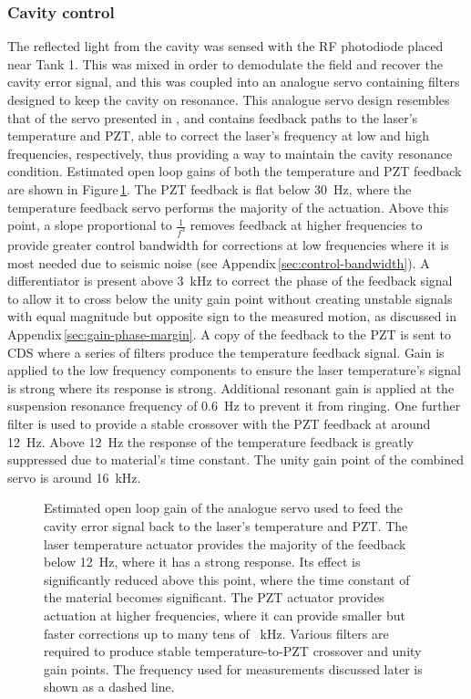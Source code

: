 \subsubsection{\label{sec:cavity-control}Cavity control}
The reflected light from the cavity was sensed with the \gls{RF} photodiode placed near Tank 1. This was mixed in order to demodulate the field and recover the cavity error signal, and this was coupled into an analogue servo containing filters designed to keep the \FP{} cavity on resonance. This analogue servo design resembles that of the servo presented in \cite{Macarthur2014}, and contains feedback paths to the laser's temperature and \gls{PZT}, able to correct the laser's frequency at low and high frequencies, respectively, thus providing a way to maintain the cavity resonance condition. Estimated open loop gains of both the temperature and \gls{PZT} feedback are shown in Figure\,\ref{fig:servo-tf}. The \gls{PZT} feedback is flat below \SI{30}{\hertz}, where the temperature feedback servo performs the majority of the actuation. Above this point, a slope proportional to $\frac{1}{f^3}$ removes feedback at higher frequencies to provide greater control bandwidth for corrections at low frequencies where it is most needed due to seismic noise (see Appendix\,\ref{sec:control-bandwidth}). A differentiator is present above \SI{3}{\kilo\hertz} to correct the phase of the feedback signal to allow it to cross below the unity gain point without creating unstable signals with equal magnitude but opposite sign to the measured motion, as discussed in Appendix\,\ref{sec:gain-phase-margin}. A copy of the feedback to the \gls{PZT} is sent to \gls{CDS} where a series of filters produce the temperature feedback signal. Gain is applied to the low frequency components to ensure the laser temperature's signal is strong where its response is strong. Additional resonant gain is applied at the suspension resonance frequency of \SI{0.6}{\hertz} to prevent it from ringing. One further filter is used to provide a stable crossover with the \gls{PZT} feedback at around \SI{12}{\hertz}. Above \SI{12}{\hertz} the response of the temperature feedback is greatly suppressed due to material's time constant. The unity gain point of the combined servo is around \SI{16}{\kilo\hertz}.

\begin{figure}
  \centering
  
  \caption[Waveguide cavity frequency stabilisation servo open loop gain]{\label{fig:servo-tf}Estimated open loop gain of the analogue servo used to feed the cavity error signal back to the laser's temperature and \gls{PZT}. The laser temperature actuator provides the majority of the feedback below \SI{12}{\hertz}, where it has a strong response. Its effect is significantly reduced above this point, where the time constant of the material becomes significant. The \gls{PZT} actuator provides actuation at higher frequencies, where it can provide smaller but faster corrections up to many tens of \SI{}{\kilo\hertz}. Various filters are required to produce stable temperature-to-\gls{PZT} crossover and unity gain points. The frequency used for measurements discussed later is shown as a dashed line.}
\end{figure}

